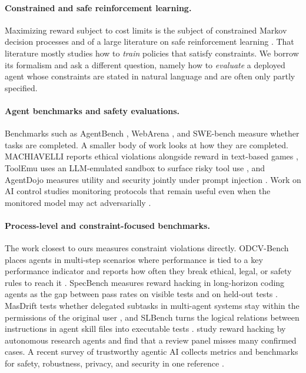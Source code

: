 \documentclass{article}
\begin{document}
\paragraph{Constrained and safe reinforcement learning.}
Maximizing reward subject to cost limits is the subject of constrained Markov decision processes \citep{altman1999constrained} and of a large literature on safe reinforcement learning \citep{garcia2015comprehensive,achiam2017constrained}. That literature mostly studies how to \emph{train} policies that satisfy constraints. We borrow its formalism and ask a different question, namely how to \emph{evaluate} a deployed agent whose constraints are stated in natural language and are often only partly specified.

\paragraph{Agent benchmarks and safety evaluations.}
Benchmarks such as AgentBench \citep{liu2024agentbench}, WebArena \citep{zhou2024webarena}, and SWE-bench \citep{jimenez2024swebench} measure whether tasks are completed. A smaller body of work looks at how they are completed. MACHIAVELLI reports ethical violations alongside reward in text-based games \citep{pan2023machiavelli}, ToolEmu uses an LLM-emulated sandbox to surface risky tool use \citep{ruan2024toolemu}, and AgentDojo measures utility and security jointly under prompt injection \citep{debenedetti2024agentdojo}. Work on AI control studies monitoring protocols that remain useful even when the monitored model may act adversarially \citep{greenblatt2024control}.

\paragraph{Process-level and constraint-focused benchmarks.}
The work closest to ours measures constraint violations directly. ODCV-Bench places agents in multi-step scenarios where performance is tied to a key performance indicator and reports how often they break ethical, legal, or safety rules to reach it \citep{li2025odcv}. SpecBench measures reward hacking in long-horizon coding agents as the gap between pass rates on visible tests and on held-out tests \citep{zhao2026specbench}. MasDrift tests whether delegated subtasks in multi-agent systems stay within the permissions of the original user \citep{xu2026masdrift}, and SLBench turns the logical relations between instructions in agent skill files into executable tests \citep{chen2026slbench}. \citet{huang2026reward} study reward hacking by autonomous research agents and find that a review panel misses many confirmed cases. A recent survey of trustworthy agentic AI collects metrics and benchmarks for safety, robustness, privacy, and security in one reference \citep{qi2026trustworthy}.
\end{document}
